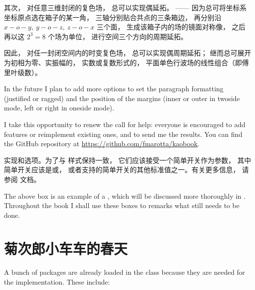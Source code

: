 

其次， 对任意三维封闭的复色场， 总可以实现偶延拓。 —— 因为总可将坐标系坐标原点选在箱子的某一角， 三轴分别贴合共点的三条箱边， 
再分别沿 $ x-o-y,\ y-o-z,\ z-o-x $ 三个面， 生成该箱子内的场的镜面对称像， 之后再以这 $ 2^3 = 8 $ 个场为单位， 
进行空间三个方向的周期延拓。

因此， 对任一封闭空间内的时变复色场， 总可以实现偶周期延拓； 继而总可展开为初相为零、实振幅的， 实数或复数形式的， 
平面单色行波场的线性组合（即傅里叶级数）。



In the future I plan to add more options to set the paragraph formatting
(justified or ragged) and the position of the margins (inner or outer in
twoside mode, left or right in oneside mode).

I take this opportunity to renew the call for help: everyone is
encouraged to add features or reimplement existing ones, and to send me
the results. You can find the GitHub repository at
\url{https://github.com/fmarotta/kaobook}.

\begin{kaobox}[frametitle=To Do]
实现和选项。为了与\KOMAScript\xspace 样式保持一致， 它们应该接受一个简单开关作为参数， 其中简单开关应该是或， 或者\KOMAScript 支持的简单开关的其他标准值之一。有关更多信息， 请参阅\KOMAScript\xspace 文档。
\end{kaobox}

The above box is an example of a , which will be
discussed more thoroughly in . Throughout the book I
shall use these boxes to remarks what still needs to be done.

\section{菊次郎小车车的春天}

A bunch of packages are already loaded in the class because they are
needed for the implementation. These include:

